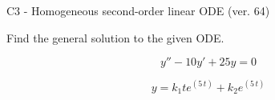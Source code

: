 \begin{exercise}
  \begin{exerciseTitle}C3 - Homogeneous second-order linear ODE (ver. 64)\end{exerciseTitle}
  \begin{exerciseStatement}
    
Find the general solution to the given ODE.

    
\[y''-10y'+25y = 0\]

  \end{exerciseStatement}
  \begin{exerciseAnswer}
    
\[y= k_{1} t e^{\left(5 \, t\right)} + k_{2} e^{\left(5 \, t\right)}\]

  \end{exerciseAnswer}
\end{exercise}